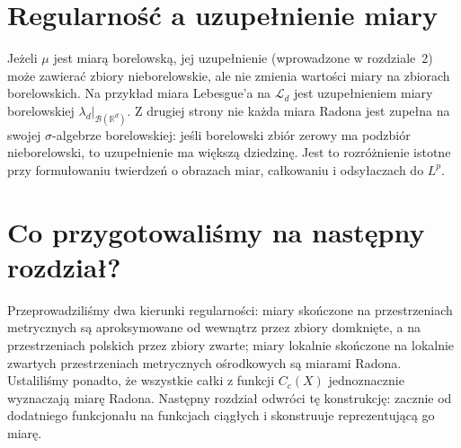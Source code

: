 \section{Regularność a uzupełnienie miary}
Jeżeli $\mu$ jest miarą borelowską, jej uzupełnienie
(wprowadzone w rozdziale~2) może zawierać zbiory
nieborelowskie, ale nie zmienia wartości miary
na zbiorach borelowskich. Na przykład miara Lebesgue'a
na $\mathcal L_d$ jest uzupełnieniem miary borelowskiej
$\lambda_d|_{\mathcal B(\mathbb R^d)}$. Z drugiej strony
nie każda miara Radona jest zupełna na swojej
$\sigma$-algebrze borelowskiej: jeśli borelowski zbiór
zerowy ma podzbiór nieborelowski, to uzupełnienie
ma większą dziedzinę. Jest to rozróżnienie
istotne przy formułowaniu twierdzeń o obrazach miar,
całkowaniu i odsyłaczach do $L^p$.

\section{Co przygotowaliśmy na następny rozdział?}
Przeprowadziliśmy dwa kierunki regularności:
miary skończone na przestrzeniach metrycznych są
aproksymowane od wewnątrz przez zbiory domknięte,
a na przestrzeniach polskich przez zbiory zwarte;
miary lokalnie skończone na lokalnie zwartych
przestrzeniach metrycznych ośrodkowych są miarami Radona.
Ustaliliśmy ponadto, że wszystkie całki z funkcji
$C_c(X)$ jednoznacznie wyznaczają miarę Radona.
Następny rozdział odwróci tę konstrukcję:
zacznie od dodatniego funkcjonału na funkcjach ciągłych
i skonstruuje reprezentującą go miarę.

